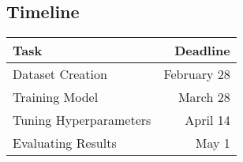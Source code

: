 \documentclass[
11pt,notheorems,hyperref={pdfauthor=whatever}
]{beamer}
\begin{document}
\begin{Large}
         

        

  		 
			


\section{Timeline}
\begin{frame}
    \begin{table}
        \begin{tabular}{@{} lr @{}}
          \toprule
          Task & Deadline \\ 
          \midrule
          
          Dataset Creation & February 28 \\
          Training Model &  March 28 \\
          Tuning Hyperparameters & April 14 \\
          Evaluating Results & May 1 \\
          \bottomrule
        \end{tabular}
        \hspace*{1cm}
            \setlength\extrarowheight{3pt}
    \end{table}
\end{frame}






\end{Large}
\end{document}
